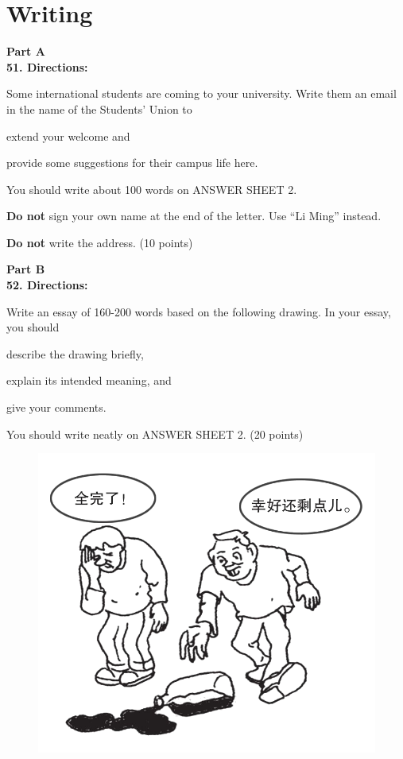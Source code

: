 \newpage


\section{Writing}


\noindent
\textbf{Part A}\\
\textbf{51. Directions:}

Some international students are coming to your university. Write them an
email in the name of the Students' Union to
\begin{listwrite}
	\item
 extend your welcome and

\item 
provide some suggestions for their campus life here.
\end{listwrite}


You should write about 100 words on ANSWER SHEET 2.

\textbf{Do not} sign your own name at the end of the letter. Use ``Li
Ming'' instead.

\textbf{Do not} write the address. (10 points)


\vspace{2em}

\noindent
\textbf{Part B}\\
\textbf{52. Directions:}

Write an essay of 160-200 words based on the following drawing. In your
essay, you should
\begin{listwrite}
	\item
describe the drawing briefly,

\item 
explain its intended meaning, and

\item 
 give your comments.
\end{listwrite}

You should write neatly on ANSWER SHEET 2. (20 points)



\begin{figure}[h!]
	\centering
	\includegraphics[width=0.45\linewidth]{picture/2012.png}
\end{figure}



\checkpagenumber